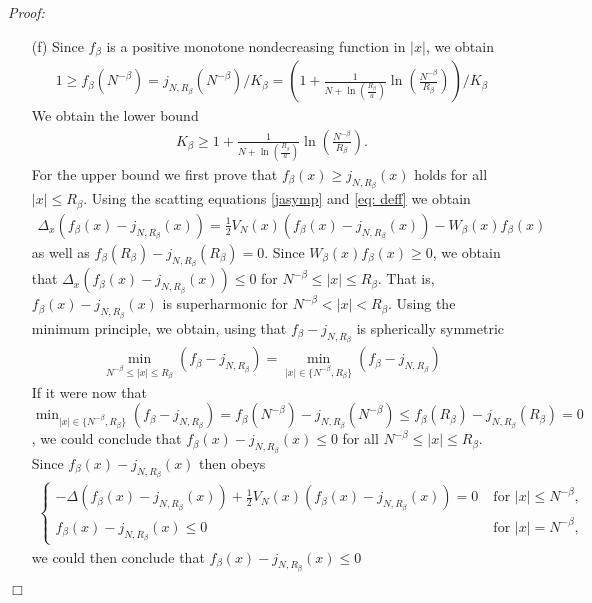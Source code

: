\documentclass[11pt, english, american]{article}
\newenvironment{proof}{\emph{Proof:}}{\begin{flushright} $ \Box $ \end{flushright}}
\begin{document}
\begin{proof}
\begin{enumerate}
\item[(f)]
Since $f_\beta$ is a positive monotone nondecreasing function in $|x|$, we obtain
\begin{align*}
1 \geq f_\beta( N^{- \beta}) =j_{N,R_\beta}( N^{- \beta}) /K_\beta
=
\left(
1+   \frac{1}{N+ \ln \left(\frac{R_\beta}{a}\right)} \ln \left( \frac{N^{-\beta}}{R_\beta} \right)
\right)
/ K_\beta
\end{align*}
We obtain the lower bound
\begin{align*}
K_\beta \ge
1+  \frac{1}{N+ \ln \left(\frac{R_\beta}{a}\right)}\ln \left( \frac{N^{-\beta}}{R_\beta} \right).
\end{align*}
For the upper bound we first prove that $f_{\beta}(x) \geq j_{N,R_\beta}(x)$ holds for all $|x | \leq R_\beta$.
Using the scatting equations \eqref{jasymp} and \eqref{eq: deff} we obtain
\begin{align*}
\Delta_x
(
f_\beta(x)-j_{N,R_\beta}(x)
)
=
\frac{1}{2}
V_N(x)
(
f_\beta(x)-j_{N,R_\beta}(x)
)
-
W_\beta(x) f_{\beta}(x)
\end{align*}
as well as
$f_{\beta}(R_\beta)- j_{N,R_\beta}(R_\beta)=0$.
Since $W_\beta(x) f_{\beta}(x) \geq 0$, we obtain that
$\Delta_x
(
f_\beta(x)-j_{N,R_\beta}(x)
) \leq 0$ for $ N^{-\beta} \leq |x|\leq R_\beta$. That is, $f_\beta(x)-j_{N,R_\beta}(x)$ is superharmonic
for $ N^{-\beta} < |x|< R_\beta$. Using the minimum principle, we obtain, using that 
$f_\beta-j_{N,R_\beta}$ is spherically symmetric
\begin{align}
\label{minimum}
\min_{N^{-\beta} \leq |x|\leq R_\beta} ( f_\beta-j_{N,R_\beta})
=
\min_{|x| \in \lbrace N^{-\beta} ,  R_\beta \rbrace} ( f_\beta-j_{N,R_\beta})
\end{align}
If it were now that $\min_{|x| \in \lbrace N^{-\beta} ,  R_\beta \rbrace} ( f_\beta-j_{N,R_\beta})
=f_{\beta}(N^{-\beta})- j_{N,R_\beta}(N^{-\beta})
\leq
f_{\beta}(R_\beta)- j_{N,R_\beta}(R_\beta)=0
$, we  could conclude that $ f_{\beta}(x)- j_{N,R_\beta}(x) \leq 0$ for all
$ N^{-\beta} \leq |x|\leq R_\beta$. Since $f_\beta(x)-j_{N,R_\beta}(x)$ then obeys
\begin{align*}
 \begin{cases} 
-\Delta 
(
f_\beta(x)-j_{N,R_\beta}(x)
)
+
\frac{1}{2}
V_N(x)
(
f_\beta(x)-j_{N,R_\beta}(x)
)
=
0
\;
&\text{for } |x| \leq N^{-\beta} ,
\\
f_\beta(x)-j_{N,R_\beta}(x) \leq 0 \; &\text{for } |x| = N^{-\beta},
  \end{cases} 
\end{align*}
 we could then conclude that $f_\beta(x)-j_{N,R_\beta}(x) \leq 0$

\end{enumerate}
\end{proof}
\end{document}

